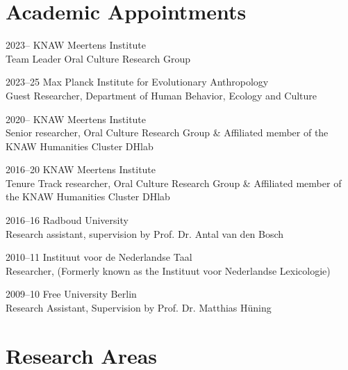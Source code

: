 \documentclass[12pt,letterpaper]{report}
\begin{document}
\section*{Academic Appointments}
\begin{tablist}
\item[2023--]   \tab{}KNAW Meertens Institute \\
  Team Leader Oral Culture Research Group
\item[2023--25]   \tab{}Max Planck Institute for Evolutionary Anthropology \\
  Guest Researcher, Department of Human Behavior, Ecology and Culture
\item[2020--]   \tab{}KNAW Meertens Institute \\
  Senior researcher, Oral Culture Research Group \& Affiliated member of the KNAW Humanities
  Cluster DHlab

\item[2016--20] \tab{}KNAW Meertens Institute \\
  Tenure Track researcher, Oral Culture Research Group \& Affiliated member of the KNAW
  Humanities Cluster DHlab

\item[2016--16] \tab{}Radboud University \\
  Research assistant, supervision by Prof. Dr. Antal van den Bosch

\item[2010--11] \tab{}Instituut voor de Nederlandse Taal \\
  Researcher, (Formerly known as the Instituut voor Nederlandse Lexicologie)

\item[2009--10] \tab{}Free University Berlin \\
  Research Assistant, Supervision by Prof. Dr. Matthias Hüning
\end{tablist}

\section*{Research Areas}
\end{document}
